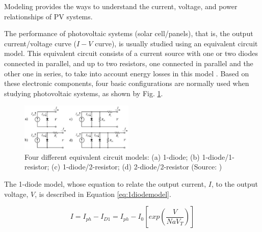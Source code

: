 \documentclass[journal]{IEEEtran}
\begin{document}
Modeling provides the ways to understand the current, voltage, and power relationships of PV systems.
  
The performance of photovoltaic systems (solar cell/panels), that is, the output current/voltage curve ($I-V$ curve), is usually studied using an equivalent circuit model. This equivalent circuit consists of a current source with one or two diodes connected in parallel, and up to two resistors, one connected in parallel and the other one in series, to take into account energy losses in this model \cite{Cubas}. Based on these electronic components, four basic configurations are normally used when studying photovoltaic systems, as shown by Fig. \ref{fig:equivckt}. 

\begin{figure}[h]
\includegraphics[width=0.48\textwidth]{equivckt}
\centering
\caption{Four different equivalent circuit models: (a) 1-diode; (b) 1-diode/1-resistor; (c) 1-diode/2-resistor; (d) 2-diode/2-resistor (Source: \cite{Cubas})}
\label{fig:equivckt}
\end{figure}
 
The 1-diode model, whose equation to relate the output current, $I$, to the output voltage, $V$, is described in Equation \ref{eq:1diodemodel}. 

\begin{equation}
\label{eq:1diodemodel}
I = I_{ph}-I_{D1}=I_{ph}-I_{0}\left[ exp \left( \dfrac{V}{NaV_{T}} \right)  \right] 
\end{equation}
\end{document}
